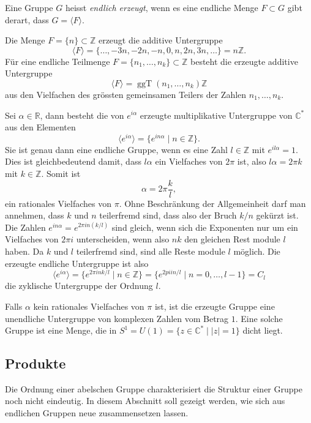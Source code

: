 \begin{definition}
Eine Gruppe $G$ heisst {\em endlich erzeugt}, wenn es eine endliche Menge
$F\subset G$ gibt derart, dass $G=\langle F\rangle$.
\end{definition}

\begin{beispiel}
Die Menge $F=\{n\}\subset\mathbb{Z}$ erzeugt die additive Untergruppe
\[
\langle F \rangle
=
\{\dots,-3n,-2n,-n,0,n,2n,3n,\dots\}
=
n\mathbb{Z}.
\]
Für eine endliche Teilmenge $F=\{n_1,\dots,n_k\}\subset\mathbb{Z}$
besteht die erzeugte additive Untergruppe
\[
\langle F\rangle
=
\operatorname{ggT}(n_1,\dots,n_k)\mathbb{Z}
\]
aus den Vielfachen des grössten gemeinsamen Teilers der Zahlen
$n_1,\dots,n_k$.
\end{beispiel}

\begin{beispiel}
Sei $\alpha\in \mathbb{R}$, dann besteht die von $e^{i\alpha}$ erzeugte
multiplikative Untergruppe von $\mathbb{C}^*$ aus den Elementen
\[
\langle e^{i\alpha}\rangle
=
\{ e^{in\alpha}\mid n\in\mathbb{Z}\}.
\]
Sie ist genau dann eine endliche Gruppe, wenn es eine Zahl $l\in\mathbb{Z}$
mit $e^{il\alpha}=1$.
Dies ist gleichbedeutend damit, dass $l\alpha$ ein Vielfaches von $2\pi$
ist, also $l\alpha = 2\pi k$ mit $k\in\mathbb{Z}$.
Somit ist 
\[
\alpha = 2\pi \frac{k}{l},
\]
ein rationales Vielfaches von $\pi$.
Ohne Beschränkung der Allgemeinheit darf man annehmen, dass $k$ und $n$
teilerfremd sind, dass also der Bruch $k/n$ gekürzt ist.
Die Zahlen $e^{in\alpha}=e^{2\pi i n (k/l)}$ sind gleich, wenn 
sich die Exponenten nur um ein Vielfaches von $2\pi i$ unterscheiden,
wenn also $nk$ den gleichen Rest module $l$ haben.
Da $k$ und $l$ teilerfremd sind, sind alle Reste module $l$ möglich.
Die erzeugte endliche Untergruppe ist also
\[
\langle e^{i\alpha}\rangle
=
\{ e^{2\pi i nk/l}\mid n\in \mathbb{Z} \}
=
\{ e^{2pi i n/l} \mid n=0,\dots,l-1 \}
=
C_l
\]
die zyklische Untergruppe der Ordnung $l$.

Falls $\alpha$ kein rationales Vielfaches von $\pi$ ist, ist die
erzeugte Gruppe eine unendliche Untergruppe von komplexen Zahlen vom
Betrag $1$.
Eine solche Gruppe ist eine Menge, die in
$S^1=U(1)=\{z\in\mathbb{C}^*\mid |z|=1\}$
dicht liegt.
\end{beispiel}

%
%
\subsection{Produkte
\label{buch:diskret:endlich:subsection:produkte}}
Die Ordnung einer abelschen Gruppe charakterisiert die Struktur einer
Gruppe noch nicht eindeutig.
In diesem Abschnitt soll gezeigt werden, wie sich aus endlichen
Gruppen neue zusammensetzen lassen.

